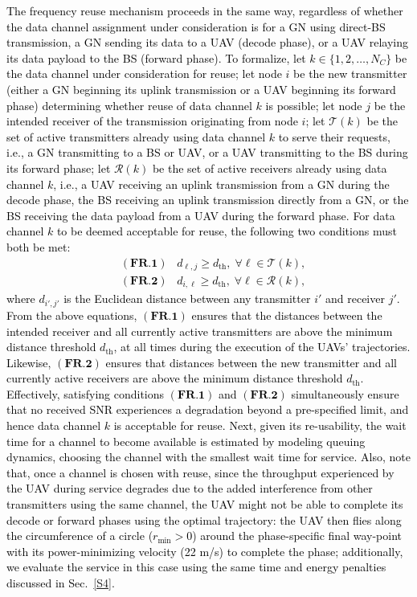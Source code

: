 \documentclass[12pt, draftcls, onecolumn]{IEEEtran}
\theoremstyle{plain}
\theoremstyle{definition}
\theoremstyle{remark}
\newcommand\hlt[1]{\textcolor{black}{#1}}
\begin{document}
\hlt{The frequency reuse mechanism proceeds in the same way, regardless of whether the data channel assignment under consideration is for a GN using direct-BS transmission, a GN sending its data to a UAV (decode phase), or a UAV relaying its data payload to the BS (forward phase). To formalize, let $k{\in}\{1,2,{\dots},N_C\}$ be the data channel under consideration for reuse; let node $i$ be the new transmitter (either a GN beginning its uplink transmission or a UAV beginning its forward phase) determining whether reuse of data channel $k$ is possible; let node $j$ be the intended receiver of the transmission originating from node $i$; let $\mathcal T (k)$ be the set of active transmitters already using data channel $k$ to serve their requests, i.e., a GN transmitting to a BS or UAV, or a UAV transmitting to the BS during its forward phase; let $\mathcal R (k)$ be the set of active receivers already using data channel $k$, i.e., a UAV receiving an uplink transmission from a GN during the decode phase, the BS receiving an uplink transmission directly from a GN, or the BS receiving the data payload from a UAV during the forward phase. For data channel $k$ to be deemed acceptable for reuse, the following two conditions must both be met:
\begin{align}
    &(\textbf{FR.1}) \;\;\; d_{\ell,j} \geq d_{\mathrm{th}}, \; \forall \ell \in \mathcal T (k), \\
    &(\textbf{FR.2}) \;\;\; d_{i,\ell} \geq d_{\mathrm{th}}, \; \forall \ell \in \mathcal R (k),
\end{align}
where $d_{i',j'}$ is the Euclidean distance between any transmitter $i'$ and receiver $j'$. From the above equations, $(\textbf{FR.1})$ ensures that the distances between the intended receiver and all currently active transmitters are above the minimum distance threshold $d_{\mathrm{th}}$, at all times during the execution of the UAVs' trajectories. Likewise, $(\textbf{FR.2})$ ensures that distances between the new transmitter and all currently active receivers are above the minimum distance threshold $d_{\mathrm{th}}$. Effectively, satisfying conditions $(\textbf{FR.1})$ and $(\textbf{FR.2})$ simultaneously ensure that no received SNR experiences a degradation beyond a pre-specified limit, and hence data channel $k$ is acceptable for reuse. Next, given its re-usability, the wait time for a channel to become available is estimated by modeling queuing dynamics, choosing the channel with the smallest wait time for service. Also, note that, once a channel is chosen with reuse, since the throughput experienced by the UAV during service degrades due to the added interference from other transmitters using the same channel, the UAV might not be able to complete its decode or forward phases using the optimal trajectory: the UAV then flies along the circumference of a circle ($r_{\min}{>}0$) around the phase-specific final way-point with its power-minimizing velocity (22 m/s) to complete the phase; additionally, we evaluate the service in this case using the same time and energy penalties discussed in Sec.~\ref{S4}.}
\end{document}
